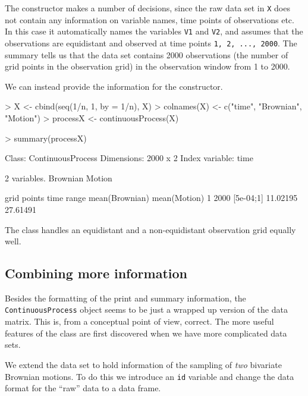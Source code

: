 \documentclass[11pt,a4paper,twoside]{article}
\begin{document}
The constructor makes a number of decisions, since the raw data set in
\verb+X+ does not contain any information on variable names, time
points of observations etc. In this case it automatically names the
variables \verb+V1+ and \verb+V2+, and assumes that the observations
are equidistant and observed at time points \verb+1, 2, ..., 2000+. The
summary tells us that the data set contains 2000 observations (the
number of grid points in the observation grid) in the observation window from 1 to 2000. 

We can instead provide the information for the constructor. 

\begin{Schunk}
\begin{Sinput}
> X <- cbind(seq(1/n, 1, by = 1/n), X)
> colnames(X) <- c("time", "Brownian", "Motion")
> processX <- continuousProcess(X)
\end{Sinput}
\end{Schunk}

\begin{Schunk}
\begin{Sinput}
> summary(processX)
\end{Sinput}
\begin{Soutput}
Class: ContinuousProcess 
Dimensions: 2000 x 2 
Index variable: time 

2 variables.
   Brownian Motion

  grid points time range mean(Brownian) mean(Motion)
1        2000  [5e-04;1]       11.02195     27.61491
\end{Soutput}
\end{Schunk}

The class handles an equidistant and a non-equidistant
observation grid equally well.

\subsection{Combining more information}

Besides the formatting of the print and summary information, 
the \verb+ContinuousProcess+ object seems to be just a wrapped up version
of the data matrix. This is, from a conceptual point of view,
correct. The more useful features of the class are first discovered
when we have more complicated data sets.

We extend the data set to hold information of the sampling of \emph{two}
bivariate Brownian motions. To do this we introduce an \verb+id+
variable and change the data format for the ``raw'' data to a data
frame. 
\end{document}
